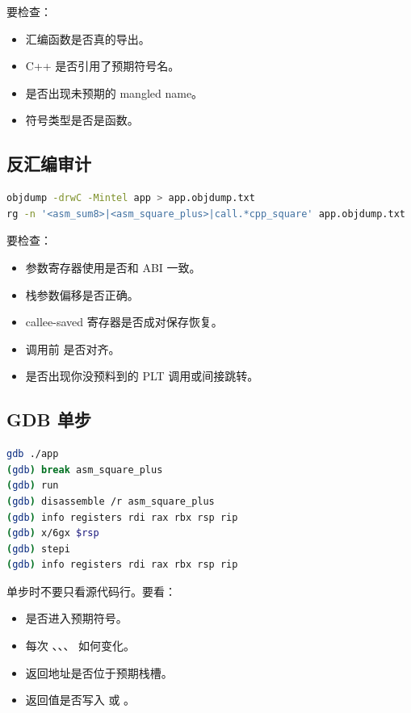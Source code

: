 要检查：

\begin{itemize}
  \item 汇编函数是否真的导出。
  \item C++ 是否引用了预期符号名。
  \item 是否出现未预期的 mangled name。
  \item 符号类型是否是函数。
\end{itemize}

\subsection{反汇编审计}

\begin{lstlisting}[language=bash]
objdump -drwC -Mintel app > app.objdump.txt
rg -n '<asm_sum8>|<asm_square_plus>|call.*cpp_square' app.objdump.txt
\end{lstlisting}

要检查：

\begin{itemize}
  \item 参数寄存器使用是否和 ABI 一致。
  \item 栈参数偏移是否正确。
  \item callee-saved 寄存器是否成对保存恢复。
  \item 调用前  是否对齐。
  \item 是否出现你没预料到的 PLT 调用或间接跳转。
\end{itemize}

\subsection{GDB 单步}

\begin{lstlisting}[language=bash]
gdb ./app
(gdb) break asm_square_plus
(gdb) run
(gdb) disassemble /r asm_square_plus
(gdb) info registers rdi rax rbx rsp rip
(gdb) x/6gx $rsp
(gdb) stepi
(gdb) info registers rdi rax rbx rsp rip
\end{lstlisting}

单步时不要只看源代码行。要看：

\begin{itemize}
  \item {} 是否进入预期符号。
  \item {} 每次 、、、 如何变化。
  \item 返回地址是否位于预期栈槽。
  \item 返回值是否写入  或 。
\end{itemize}

